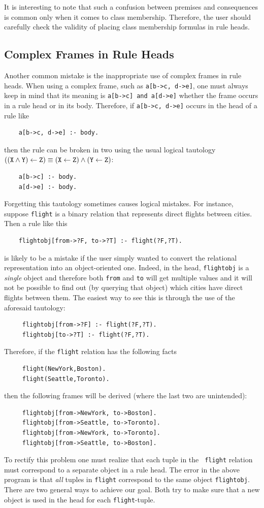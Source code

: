 \documentclass[11pt]{article}
\begin{document}
It is interesting to note that such a confusion between premises and
consequences is common only when it comes to class membership. Therefore,
the user should carefully check the validity of placing class membership
formulas in rule heads.

\subsection{Complex Frames in Rule Heads}

Another common mistake is the inappropriate use of complex frames in
rule heads. When using a complex frame, such as {\tt a[b->c, d->e]},
one must always keep in mind that  its meaning is {\tt a[b->c] and a[d->e]}
whether the frame occurs in a rule head or in its body. Therefore, if
{\tt a[b->c, d->e]} occurs in the head of a rule like
\begin{verbatim}
    a[b->c, d->e] :- body.  
\end{verbatim}
then the rule can be broken in two using the usual logical tautology 
$\tt ((X\wedge Y)\leftarrow Z) \equiv (X\leftarrow Z)\wedge(Y\leftarrow Z)$:
\begin{verbatim}
    a[b->c] :- body.
    a[d->e] :- body.
\end{verbatim}
Forgetting this tautology sometimes causes logical mistakes.
For instance, suppose {\tt flight} is a binary relation that represents
direct flights between cities. Then a rule like this
\begin{verbatim}
    flightobj[from->?F, to->?T] :- flight(?F,?T).  
\end{verbatim}
is likely to be a mistake if the user simply wanted to convert the
relational representation into an object-oriented one. Indeed, in the head,
{\tt flightobj} is a \emph{single} object and therefore both {\tt from} and
{\tt to} will get multiple values and it will not be possible to find out
(by querying that object) which cities have direct flights between them.
The easiest way to see this is through the use of the aforesaid tautology:
\begin{verbatim}
     flightobj[from->?F] :- flight(?F,?T).
     flightobj[to->?T] :- flight(?F,?T).
\end{verbatim}
Therefore, if the {\tt flight} relation has the following facts
\begin{verbatim}
     flight(NewYork,Boston).  
     flight(Seattle,Toronto).  
\end{verbatim}
then the following frames will be derived (where the last two are
unintended):
\begin{verbatim}
     flightobj[from->NewYork, to->Boston].  
     flightobj[from->Seattle, to->Toronto].  
     flightobj[from->NewYork, to->Toronto].  
     flightobj[from->Seattle, to->Boston].  
\end{verbatim}
To rectify this problem one must realize that each tuple in the {\tt
  flight} relation must correspond to a separate object in a rule head.
The error in the above program is that \emph{all} tuples in {\tt flight}
correspond to the same object {\tt flightobj}.  There are two general ways
to achieve our goal. Both try to make sure that a new object is used in
the head for each {\tt flight}-tuple.
\end{document}
